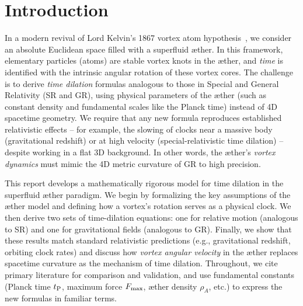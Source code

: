 
\section{Introduction}
In a modern revival of Lord Kelvin’s 1867 vortex atom hypothesis~\cite{Kelvin1867-vortex}, we consider an absolute Euclidean space filled with a superfluid æther. In this framework, elementary particles (atoms) are stable vortex knots in the æther, and \emph{time} is identified with the intrinsic angular rotation of these vortex cores. The challenge is to derive \emph{time dilation} formulas analogous to those in Special and General Relativity (SR and GR), using physical parameters of the æther (such as constant density and fundamental scales like the Planck time) instead of 4D spacetime geometry. We require that any new formula reproduces established relativistic effects – for example, the slowing of clocks near a massive body (gravitational redshift) or at high velocity (special-relativistic time dilation) – despite working in a flat 3D background. In other words, the æther’s \emph{vortex dynamics} must mimic the 4D metric curvature of GR to high precision.

This report develops a mathematically rigorous model for time dilation in the superfluid æther paradigm. We begin by formalizing the key assumptions of the æther model and defining how a vortex’s rotation serves as a physical clock. We then derive two sets of time-dilation equations: one for relative motion (analogous to SR) and one for gravitational fields (analogous to GR). Finally, we show that these results match standard relativistic predictions (e.g., gravitational redshift, orbiting clock rates) and discuss how \emph{vortex angular velocity} in the æther replaces spacetime curvature as the mechanism of time dilation. Throughout, we cite primary literature for comparison and validation, and use fundamental constants (Planck time $t_{\rm P}$, maximum force $F_{\rm max}$, æther density $\rho_{\!A}$, etc.) to express the new formulas in familiar terms.
